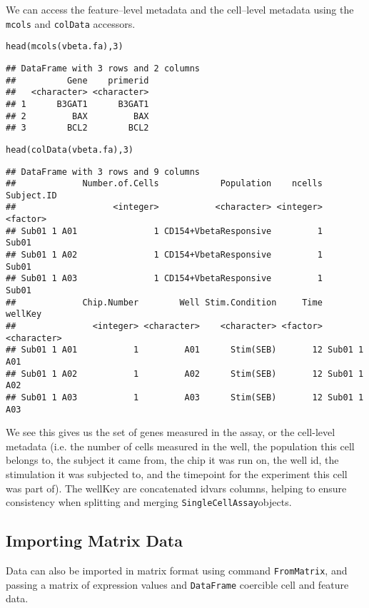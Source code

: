 \documentclass{article}\usepackage[]{graphicx}\usepackage[usenames,dvipsnames]{color}
\newcommand{\hlnum}[1]{\textcolor[rgb]{0.816,0.125,0.439}{#1}}%
\newcommand{\hlstd}[1]{\textcolor[rgb]{0.251,0.251,0.251}{#1}}%
\newcommand{\hlkwd}[1]{\textcolor[rgb]{0.878,0.439,0.125}{#1}}%
\newenvironment{knitrout}{}{} %
\newcommand{\sca}{\texttt{SingleCellAssay}}
\begin{document}
We can access the feature--level metadata and the cell--level metadata using
the \texttt{mcols} and \texttt{colData} accessors.

\begin{knitrout}
\color{fgcolor}\begin{kframe}
\begin{alltt}
\hlkwd{head}\hlstd{(}\hlkwd{mcols}\hlstd{(vbeta.fa),}\hlnum{3}\hlstd{)}
\end{alltt}
\begin{verbatim}
## DataFrame with 3 rows and 2 columns
##          Gene    primerid
##   <character> <character>
## 1      B3GAT1      B3GAT1
## 2         BAX         BAX
## 3        BCL2        BCL2
\end{verbatim}
\begin{alltt}
\hlkwd{head}\hlstd{(}\hlkwd{colData}\hlstd{(vbeta.fa),}\hlnum{3}\hlstd{)}
\end{alltt}
\begin{verbatim}
## DataFrame with 3 rows and 9 columns
##             Number.of.Cells            Population    ncells Subject.ID
##                   <integer>           <character> <integer>   <factor>
## Sub01 1 A01               1 CD154+VbetaResponsive         1      Sub01
## Sub01 1 A02               1 CD154+VbetaResponsive         1      Sub01
## Sub01 1 A03               1 CD154+VbetaResponsive         1      Sub01
##             Chip.Number        Well Stim.Condition     Time     wellKey
##               <integer> <character>    <character> <factor> <character>
## Sub01 1 A01           1         A01      Stim(SEB)       12 Sub01 1 A01
## Sub01 1 A02           1         A02      Stim(SEB)       12 Sub01 1 A02
## Sub01 1 A03           1         A03      Stim(SEB)       12 Sub01 1 A03
\end{verbatim}
\end{kframe}
\end{knitrout}

We see this gives us the set of genes measured in the assay, or the cell-level
metadata (i.e. the number of cells measured in the well, the population this
cell belongs to, the subject it came from, the chip it was run on, the well
id, the stimulation it was subjected to, and the timepoint for the experiment
this cell was part of). The wellKey are concatenated idvars columns, helping to
ensure consistency when splitting and merging \sca objects. 
\subsection{Importing Matrix Data}
Data can also be imported in matrix format using command \texttt{FromMatrix}, and passing a matrix of expression values and \texttt{DataFrame} coercible cell and feature data.
\end{document}
